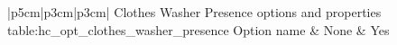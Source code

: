 \begin{customLongTable}{ |p{5cm}|p{3cm}|p{3cm}| }
{Clothes Washer Presence options and properties} {table:hc_opt_clothes_washer_presence}
{Option name & None & Yes}
\endhead
\hline
\end{customLongTable}
